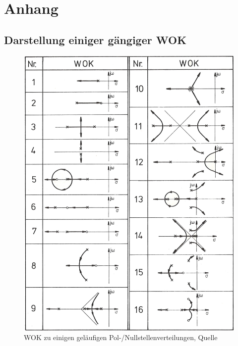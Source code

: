 \newpage
\section{Anhang}
  \subsection{Darstellung einiger gängiger WOK}
    \begin{figure}[h!]
      \begin{center}
		    \includegraphics[width=14cm]{./images/BilderWOK.png}
		    \caption{WOK zu einigen geläufigen Pol-/Nullstellenverteilungen, Quelle}
      \end{center}
	  \end{figure}
     \clearpage
 
